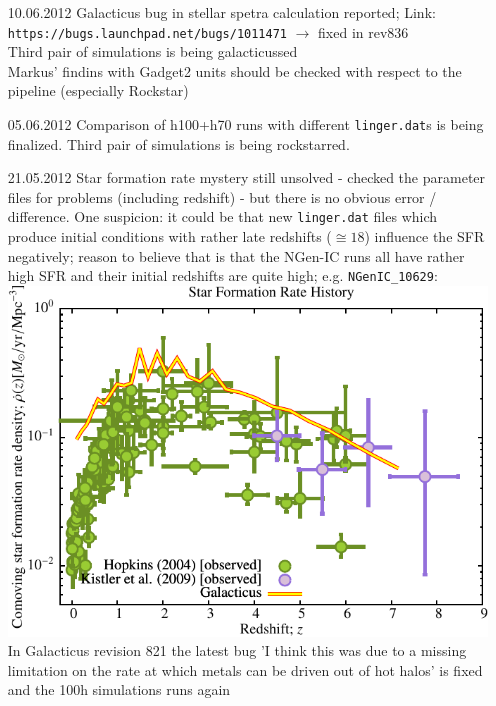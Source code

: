 \begin{itemize}
\begin{table}[p]
\begin{tabular}{l|c|c}
\end{tabular}
\caption{Comparison}
\end{table}

\texttt{MUSIC\_3} and \texttt{MUSIC\_4} are to be rockstar-tested with 
respect to different particle types  + Markus wants to test refinement \\
Galacticus: "merging halos [...] have zero separation"-error reported 
to Peter Behroozi because this occurs already in \texttt{tree\_0\_0\_0.dat}. \\

\item[10.06.2012]
Galacticus bug in stellar spetra calculation reported; Link:
\texttt{https://bugs.launchpad.net/bugs/1011471} $\rightarrow$ fixed in rev836 \\ 
Third pair of simulations is being galacticussed \\
Markus' findins with Gadget2 units should be checked with respect 
to the pipeline (especially Rockstar) \\

\item[05.06.2012]
Comparison of h100+h70 runs with different \texttt{linger.dat}s 
is being finalized. Third pair of simulations is being rockstarred. \\

\item[21.05.2012]
Star formation rate mystery still unsolved - checked the parameter 
files for problems (including redshift) - but there is no obvious 
error / difference. One suspicion: it could be that new 
\texttt{linger.dat} files 
which produce initial conditions with rather late redshifts ($\cong 18$) 
influence the SFR negatively; reason to believe that is that the 
NGen-IC runs all have rather high SFR and their initial redshifts 
are quite high; e.g. \texttt{NGenIC\_10629}: \\
\includegraphics[scale=0.5]{r256/h100/NGenIC_10629/Plot_Star_Formation_History.pdf}\\
In Galacticus revision 821 the latest bug 'I think this was 
due to a missing limitation on the rate at which metals 
can be driven out of hot halos' is fixed and the 100h 
simulations runs again 



\end{itemize}
